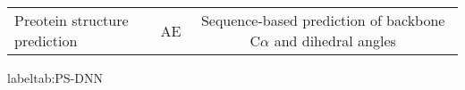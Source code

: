 \begin{table}[h!]
\centering
\begin{tabular}{|l|c|c|}
    \hline
    Preotein structure prediction & AE & Sequence-based prediction of backbone C$\alpha$ and dihedral angles 
    \hline
\end{tabular}
\caption{}
label{tab:PS-DNN}
\end{table}